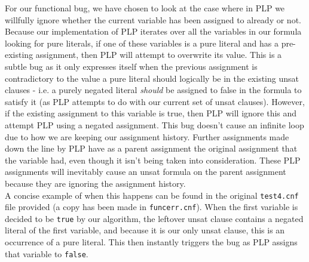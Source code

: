 \documentclass[a4paper]{article}
\begin{document}
For our functional bug, we have chosen to look at the case where in PLP we willfully ignore whether the current variable has been assigned to already or not. Because our implementation of PLP iterates over all the variables in our formula looking for pure literals, if one of these variables is a pure literal and has a pre-existing assignment, then PLP will attempt to overwrite its value. This is a subtle bug as it only expresses itself when the previous assignment is contradictory to the value a pure literal should logically be in the existing unsat clauses - i.e. a purely negated literal \textit{should} be assigned to false in the formula to satisfy it (as PLP attempts to do with our current set of unsat clauses). However, if the existing assignment to this variable is true, then PLP will ignore this and attempt PLP using a negated assignment. This bug doesn't cause an infinite loop due to how we are keeping our assignment history. Further assignments made down the line by PLP have as a parent assignment the original assignment that the variable had, even though it isn't being taken into consideration. These PLP assignments will inevitably cause an unsat formula on the parent assignment because they are ignoring the assignment history. \\

A concise example of when this happens can be found in the original \texttt{test4.cnf} file provided (a copy has been made in \texttt{funcerr.cnf}). When the first variable is decided to be \texttt{true} by our algorithm, the leftover unsat clause contains a negated literal of the first variable, and because it is our only unsat clause, this is an occurrence of a pure literal. This then instantly triggers the bug as PLP assigns that variable to \texttt{false}.
\end{document}
